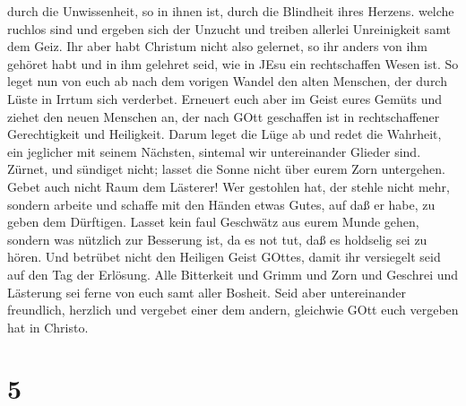 durch die Unwissenheit, so in ihnen ist, durch die Blindheit ihres
Herzens.  welche ruchlos sind und ergeben sich der Unzucht
und treiben allerlei Unreinigkeit samt dem Geiz.  Ihr aber
habt Christum nicht also gelernet,  so ihr anders von ihm
gehöret habt und in ihm gelehret seid, wie in JEsu ein rechtschaffen
Wesen ist.  So leget nun von euch ab nach dem vorigen
Wandel den alten Menschen, der durch Lüste in Irrtum sich verderbet.
 Erneuert euch aber im Geist eures Gemüts  und
ziehet den neuen Menschen an, der nach GOtt geschaffen ist in
rechtschaffener Gerechtigkeit und Heiligkeit.  Darum leget
die Lüge ab und redet die Wahrheit, ein jeglicher mit seinem Nächsten,
sintemal wir untereinander Glieder sind.  Zürnet, und
sündiget nicht; lasset die Sonne nicht über eurem Zorn untergehen.
 Gebet auch nicht Raum dem Lästerer!  Wer
gestohlen hat, der stehle nicht mehr, sondern arbeite und schaffe mit
den Händen etwas Gutes, auf daß er habe, zu geben dem Dürftigen.
 Lasset kein faul Geschwätz aus eurem Munde gehen, sondern
was nützlich zur Besserung ist, da es not tut, daß es holdselig sei zu
hören.  Und betrübet nicht den Heiligen Geist GOttes, damit
ihr versiegelt seid auf den Tag der Erlösung.  Alle
Bitterkeit und Grimm und Zorn und Geschrei und Lästerung sei ferne von
euch samt aller Bosheit.  Seid aber untereinander
freundlich, herzlich und vergebet einer dem andern, gleichwie GOtt euch
vergeben hat in Christo.

\hypertarget{section-4}{%
\section{5}\label{section-4}}

